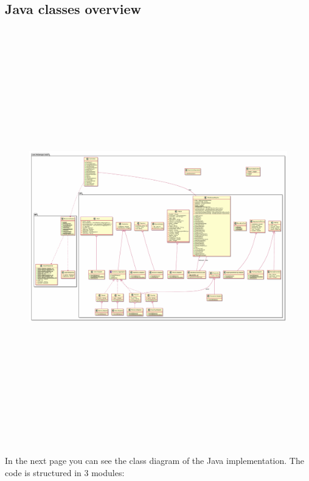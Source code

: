 \documentclass[11pt]{article}
\begin{document}
\subsection{Java classes overview}
\begin{figure}
	\vspace{-2cm}
	\hspace{-1cm}
	\includegraphics[height=18cm,angle=90]{figs/backend.pdf}
\end{figure}

In the next page you can see the class diagram of the Java implementation.
The code is structured in 3 modules: 
\end{document}
